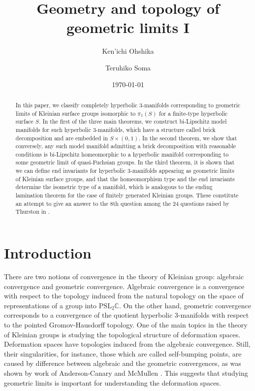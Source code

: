 \documentclass{amsart}
\title{Geometry and topology of geometric limits I}
\author{Ken'ichi Ohshika}
\author{Teruhiko Soma}
\date{\today}
\theoremstyle{definition}
\numberwithin{figure}{section}
\numberwithin{equation}{section}
\newcommand{\blackboard}[1]{\ensuremath{\mathbb{#1}}}
\newcommand{\complexes}{\blackboard{C}}
\begin{document}
\maketitle

\begin{abstract}
In this paper, we classify completely hyperbolic 3-manifolds corresponding to geometric limits of Kleinian surface groups isomorphic to $\pi_1(S)$ for a finite-type hyperbolic surface $S$.
In the first of the three main theorems, we construct  bi-Lipschitz model manifolds for such hyperbolic 3-manifolds,  which have  a structure called brick decomposition and  are embedded in $S \times (0,1)$.
In the second theorem, we  show that conversely, any such model manifold  admitting a brick decomposition  with reasonable conditions is bi-Lipschitz homeomorphic to a hyperbolic manifold corresponding to some geometric limit of quasi-Fuchsian groups.
In the third theorem, it is shown that we can define end invariants for hyperbolic 3-manifolds appearing as geometric limits of Kleinian surface groups, and that the homeomorphism type and the end invariants determine the isometric type of a manifold, which is analogous to the ending lamination theorem for the case of finitely generated Kleinian groups.
These constitute an attempt to give an answer to the 8th question  among the 24 questions raised by Thurston in \cite{th2}. 
\end{abstract}



\setcounter{section}{-1}
\section{Introduction}


There are two notions of convergence in the theory of Kleinian group: algebraic convergence and   geometric convergence.
Algebraic convergence is a convergence with respect to the topology induced from the natural topology on the space of representations of a group into $\mathrm{PSL}_2\complexes$. 
On the other hand, geometric convergence corresponds to a convergence of the  quotient hyperbolic $3$-manifolds with respect to the pointed Gromov-Hausdorff topology.
One of the main topics in the theory of Kleinian groups is studying the topological structure of deformation spaces.
Deformation spaces have topologies induced from the algebraic convergence.
Still, their singularities, for instance, those which are called self-bumping points, are caused by difference between algebraic and the geometric convergences, as was shown by work of Anderson-Canary \cite{ac0} and McMullen \cite{Mc2}.
This suggests that studying geometric limits is important for understanding the deformation spaces.
\end{document}
